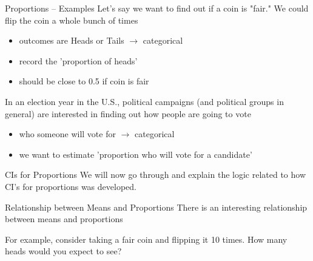 \documentclass{beamer}
\begin{document}
\begin{frame}{Proportions -- Examples}
Let's say we want to find out if a coin is "fair." We could flip the coin a whole bunch of times
\begin{itemize}
    \item outcomes are Heads or Tails $\rightarrow$ categorical
    \item record the 'proportion of heads'
    \item should be close to 0.5 if coin is fair
\end{itemize} \vspace{8mm}

In an election year in the U.S., political campaigns (and political groups in general) are interested in finding out how people are going to vote
\begin{itemize}
    \item who someone will vote for $\rightarrow$ categorical
    \item we want to estimate 'proportion who will vote for a candidate'
\end{itemize} \vspace{3mm}
\end{frame}

\begin{frame}{CIs for Proportions}
We will now go through and explain the logic related to how CI's for proportions was developed.
\end{frame}

\begin{frame}{Relationship between Means and Proportions}
There is an interesting relationship between means and proportions \vspace{4mm}

For example, consider taking a fair coin and flipping it 10 times. How many heads would you expect to see?
\end{frame}
\end{document}
